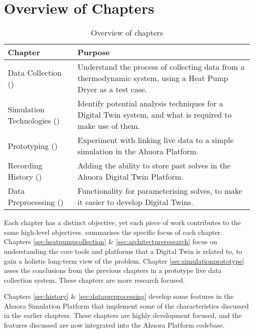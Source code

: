 \section{Overview of Chapters}

\begin{table}[ht]
    \centering
    \caption{Overview of chapters}
    \label{tab:research_chapters}
    \begin{tabular}{|L{4.5cm}|p{11.5cm}|}
    \hline
    \textbf{Chapter} & \textbf{Purpose} \\
    \hline
    Data Collection \mbox{()}& Understand the process of collecting data from a thermodynamic system, using a Heat Pump Dryer as a test case. \\ \hline
    Simulation Technologies \mbox{()}& Identify potential analysis techniques for a Digital Twin system, and what is required to make use of them. \\\hline
    Prototyping \mbox{()}& Experiment with linking live data to a simple simulation in the Ahuora Platform. \\\hline
    Recording History \mbox{()}& Adding the ability to store past solves in the Ahuora Digital Twin Platform. \\\hline
    Data Preprocessing \mbox{()}& Functionality for parameterising solves, to make it easier to develop Digital Twins. \\
    \hline
    \end{tabular}
\end{table}

Each chapter has a distinct objective, yet each piece of work contributes to the same high-level objectives.  summarises the specific focus of each chapter. 
Chapters \ref{sec:heatpumpcollection} \& \ref{sec:architectureresearch} focus on understanding the core tools and platforms that a Digital Twin is related to, to gain a holistic long-term view of the problem. Chapter \ref{sec:simulationprototype} asses the conclusions from the previous chapters in a prototype live data collection system. These chapters are more research focused.

Chapters \ref{sec:history} \& \ref{sec:datapreprocessing} develop some features in the Ahuora Simulation Platform that implement some of the characteristics discussed in the earlier chapters. These chapters are highly development focused, and the features discussed are now integrated into the Ahuora Platform codebase.

